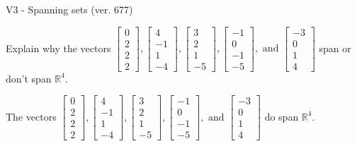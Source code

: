 \begin{exercise}
  \begin{exerciseTitle}V3 - Spanning sets (ver. 677)\end{exerciseTitle}
  \begin{exerciseStatement}
    Explain why the vectors \(\left[\begin{array}{r}
0 \\
2 \\
2 \\
2
\end{array}\right] , \left[\begin{array}{r}
4 \\
-1 \\
1 \\
-4
\end{array}\right] , \left[\begin{array}{r}
3 \\
2 \\
1 \\
-5
\end{array}\right] , \left[\begin{array}{r}
-1 \\
0 \\
-1 \\
-5
\end{array}\right] , \text{ and } \left[\begin{array}{r}
-3 \\
0 \\
1 \\
4
\end{array}\right]\) span or don't span \(\mathbb{R}^4\). 
	


  \end{exerciseStatement}
  \begin{exerciseAnswer}
   The vectors \(\left[\begin{array}{r}
0 \\
2 \\
2 \\
2
\end{array}\right] , \left[\begin{array}{r}
4 \\
-1 \\
1 \\
-4
\end{array}\right] , \left[\begin{array}{r}
3 \\
2 \\
1 \\
-5
\end{array}\right] , \left[\begin{array}{r}
-1 \\
0 \\
-1 \\
-5
\end{array}\right] , \text{ and } \left[\begin{array}{r}
-3 \\
0 \\
1 \\
4
\end{array}\right]\) 
  	 do  
	span \(\mathbb{R}^4\).
  


  \end{exerciseAnswer}
\end{exercise}